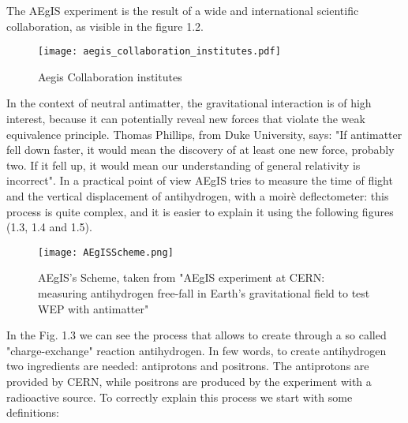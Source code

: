 The AEgIS experiment is the result of a wide and international scientific collaboration, as visible in the figure 1.2.

\begin{figure}[H]
\centering 
\texttt{[image: aegis\_collaboration\_institutes.pdf]} 
\caption{Aegis Collaboration institutes}
\end{figure}


In the context of neutral antimatter, the gravitational interaction is of high interest, because it can potentially reveal new forces that violate the weak equivalence principle. Thomas Phillips, from Duke University, says: "If antimatter fell down faster, it would mean the discovery of at least one new force, probably two. If it fell up, it would mean our understanding of general relativity is incorrect". In a practical point of view AEgIS tries to measure the time of flight and the vertical displacement of antihydrogen, with a moirè deflectometer: this process is quite complex, and it is easier to explain it using the following figures (1.3, 1.4 and 1.5).

\begin{figure}[H]
\centering 
\texttt{[image: AEgISScheme.png]} 
\caption{AEgIS's Scheme, taken from "AEgIS experiment at CERN: measuring antihydrogen free-fall in Earth’s gravitational field to test WEP with antimatter"}
\end{figure}

In the Fig. 1.3 we can see the process that allows to create through a so called "charge-exchange" reaction antihydrogen. In few words, to create antihydrogen two ingredients are needed: antiprotons and positrons. The antiprotons are provided by CERN, while positrons are produced by the experiment with a radioactive source. To correctly explain this process we start with some definitions:


